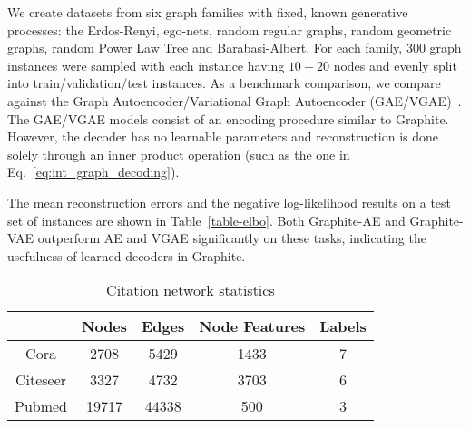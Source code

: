 \documentclass{article}
\newcommand{\name}{Graphite}
\begin{document}
We create datasets from six graph families with fixed, known generative processes: the Erdos-Renyi, ego-nets, random regular graphs,  random geometric graphs, random Power Law Tree and Barabasi-Albert. For each family, 300 graph instances were sampled with each instance having $10-20$ nodes and evenly split into train/validation/test instances. As a benchmark comparison, we compare against the Graph Autoencoder/Variational Graph Autoencoder (GAE/VGAE)~\citep{kipf2016variational}. The GAE/VGAE models consist of an encoding procedure similar to \name{}. However, the decoder has no learnable parameters and reconstruction is done solely through an inner product operation (such as the one in Eq.~\eqref{eq:int_graph_decoding}). 

The mean reconstruction errors and the negative log-likelihood results on a test set of instances are shown in Table~\ref{table-elbo}. Both \name{}-AE and \name{}-VAE outperform AE and VGAE significantly on these tasks, indicating the usefulness of learned decoders in \name{}. 


\begin{table}[t]
\centering
  \caption{Citation network statistics}
  \label{table-stats}
  \vspace{0.05in}
  \centering
  \begin{tabular}{|c|c|c|c|c|}
    \toprule
	& Nodes & Edges & Node Features & Labels \\
    \midrule
    Cora & 2708 & 5429 & 1433 & 7\\
    Citeseer & 3327 & 4732 & 3703 & 6\\
    Pubmed & 19717 & 44338 & 500 & 3\\
    \bottomrule
  \end{tabular}
\end{table}
\end{document}
